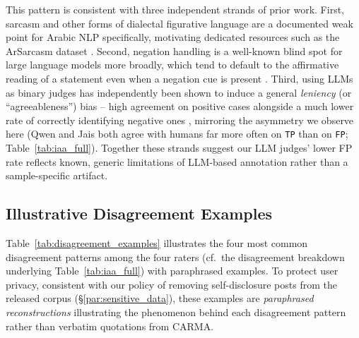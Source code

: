 \documentclass[11pt]{article}
\begin{document}
This pattern is consistent with three independent strands of prior
work. First, sarcasm and other forms of dialectal figurative language
are a documented weak point for Arabic NLP specifically, motivating
dedicated resources such as the ArSarcasm dataset
\citep{abu-farha-magdy-2020-arabic}. Second, negation handling is a
well-known blind spot for large language models more broadly, which
tend to default to the affirmative reading of a statement even when a
negation cue is present \citep{garcia-ferrero-etal-2023-not}. Third,
using LLMs as binary judges has independently been shown to induce a
general \emph{leniency} (or ``agreeableness'') bias -- high agreement
on positive cases alongside a much lower rate of correctly identifying
negative ones \citep{jain2025beyond}, mirroring the asymmetry we
observe here (Qwen and Jais both agree with humans far more often on
\texttt{TP} than on \texttt{FP}; Table~\ref{tab:iaa_full}). Together
these strands suggest our LLM judges' lower FP rate reflects known,
generic limitations of LLM-based annotation rather than a
sample-specific artifact.

\subsection*{Illustrative Disagreement Examples}

Table~\ref{tab:disagreement_examples} illustrates the four most common
disagreement patterns among the four raters (cf.\ the disagreement
breakdown underlying Table~\ref{tab:iaa_full}) with paraphrased
examples. To protect user privacy, consistent with our policy of
removing self-disclosure posts from the released corpus
(\S\ref{par:sensitive_data}), these examples are \textit{paraphrased
reconstructions} illustrating the phenomenon behind each disagreement
pattern rather than verbatim quotations from CARMA.
\end{document}
